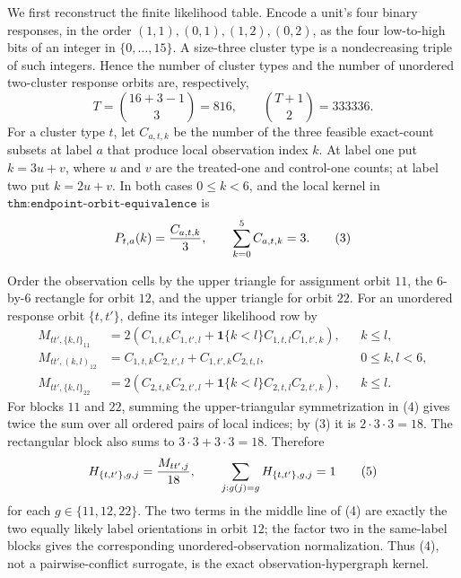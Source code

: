 We first reconstruct the finite likelihood table.  Encode a unit's four binary responses, in the order \((1,1),(0,1),(1,2),(0,2)\), as the four low-to-high bits of an integer in \(\{0,\ldots,15\}\).  A size-three cluster type is a nondecreasing triple of such integers.  Hence the number of cluster types and the number of unordered two-cluster response orbits are, respectively,
\[
T=\binom{16+3-1}{3}=816,
\qquad
\binom{T+1}{2}=333336.                                                       \tag{2}
\]
For a cluster type \(t\), let \(C_{a,t,k}\) be the number of the three feasible exact-count subsets at label \(a\) that produce local observation index \(k\).  At label one put \(k=3u+v\), where \(u\) and \(v\) are the treated-one and control-one counts; at label two put \(k=2u+v\).  In both cases \(0\le k<6\), and the local kernel in \(\texttt{thm:endpoint-orbit-equivalence}\) is
\[
P_{t,a}(k)={C_{a,t,k}\over3},
\qquad
\sum_{k=0}^{5}C_{a,t,k}=3.                                                  \tag{3}
\]

Order the observation cells by the upper triangle for assignment orbit \(11\), the \(6\)-by-\(6\) rectangle for orbit \(12\), and the upper triangle for orbit \(22\).  For an unordered response orbit \(\{t,t'\}\), define its integer likelihood row by
\[
\begin{aligned}
M_{tt',\{k,l\}_{11}}
 &=2\left(C_{1,t,k}C_{1,t',l}
       +\mathbf 1\{k<l\}C_{1,t,l}C_{1,t',k}\right), && k\le l,\\
M_{tt',(k,l)_{12}}
 &=C_{1,t,k}C_{2,t',l}+C_{1,t',k}C_{2,t,l}, &&0\le k,l<6,\\
M_{tt',\{k,l\}_{22}}
 &=2\left(C_{2,t,k}C_{2,t',l}
       +\mathbf 1\{k<l\}C_{2,t,l}C_{2,t',k}\right), && k\le l.
\end{aligned}                                                               \tag{4}
\]
For blocks \(11\) and \(22\), summing the upper-triangular symmetrization in (4) gives twice the sum over all ordered pairs of local indices; by (3) it is \(2\cdot3\cdot3=18\).  The rectangular block also sums to \(3\cdot3+3\cdot3=18\).  Therefore
\[
H_{\{t,t'\},g,j}={M_{tt',j}\over18},
\qquad
\sum_{j:g(j)=g}H_{\{t,t'\},g,j}=1                                        \tag{5}
\]
for each \(g\in\{11,12,22\}\).  The two terms in the middle line of (4) are exactly the two equally likely label orientations in orbit \(12\); the factor two in the same-label blocks gives the corresponding unordered-observation normalization.  Thus (4), not a pairwise-conflict surrogate, is the exact observation-hypergraph kernel.

